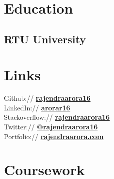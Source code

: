 \documentclass[]{deedy-resume-openfont}
\begin{document}
%
%

%
%

\begin{minipage}[t]{0.33\textwidth} 


\section{Education} 

\subsection{RTU University}
\sectionsep



\section{Links} 
Github:// \href{https://github.com/rajendraarora16}{\bf rajendraarora16} \\
LinkedIn://  \href{https://www.linkedin.com/in/arorar16/}{\bf arorar16} \\
Stackoverflow:// \href{https://stackoverflow.com/users/2802622/}{\bf rajendraarora16} \\
Twitter://  \href{https://twitter.com/rajendraarora16}{\bf @rajendraarora16} \\
Portfolio:// \href{https://rajendraarora.com/}{\bf rajendraarora.com} \\



\section{Coursework}

\end{minipage}
\end{document}
